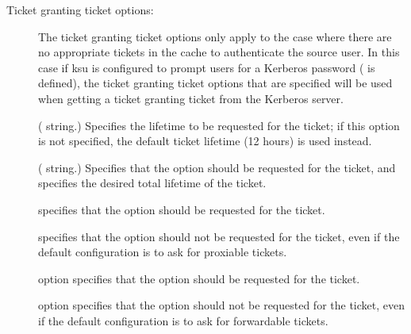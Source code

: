 \documentclass[letterpaper,10pt,english]{sphinxmanual}
\begin{document}
\sphinxAtStartPar
Ticket granting ticket options:
\begin{description}
\item[{       }] \leavevmode
\sphinxAtStartPar
The ticket granting ticket options only apply to the case where
there are no appropriate tickets in the cache to authenticate the
source user.  In this case if ksu is configured to prompt users
for a Kerberos password ( is defined), the
ticket granting ticket options that are specified will be used
when getting a ticket granting ticket from the Kerberos server.

\item[{ }] \leavevmode
\sphinxAtStartPar
( string.)  Specifies the lifetime to be requested
for the ticket; if this option is not specified, the default ticket
lifetime (12 hours) is used instead.

\item[{ }] \leavevmode
\sphinxAtStartPar
( string.)  Specifies that the  option
should be requested for the ticket, and specifies the desired
total lifetime of the ticket.

\item[{}] \leavevmode
\sphinxAtStartPar
specifies that the  option should be requested for
the ticket.

\item[{}] \leavevmode
\sphinxAtStartPar
specifies that the  option should not be requested
for the ticket, even if the default configuration is to ask for
proxiable tickets.

\item[{}] \leavevmode
\sphinxAtStartPar
option specifies that the  option should be
requested for the ticket.

\item[{}] \leavevmode
\sphinxAtStartPar
option specifies that the  option should not be
requested for the ticket, even if the default configuration is to
ask for forwardable tickets.


\end{description}
\end{document}
